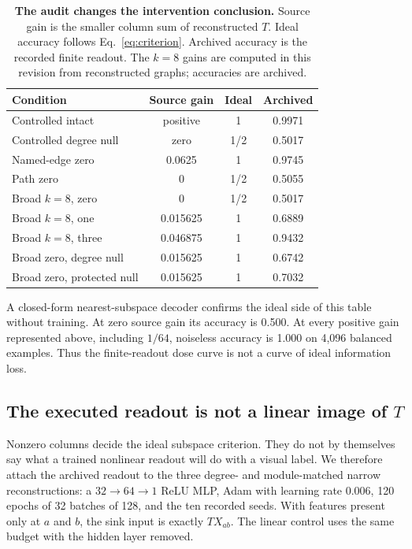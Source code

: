 \begin{table}[t]
\centering
\caption{\textbf{The audit changes the intervention conclusion.} Source gain
is the smaller column sum of reconstructed $T$. Ideal accuracy follows
Eq.~\eqref{eq:criterion}. Archived accuracy is the recorded finite readout.
The $k=8$ gains are computed in this revision from reconstructed graphs;
accuracies are archived.}
\label{tab:audit}
\small
\begin{tabular}{@{}lccc@{}}
\toprule
Condition & Source gain & Ideal & Archived \\
\midrule
Controlled intact & positive & 1 & 0.9971 \\
Controlled degree null & zero & 1/2 & 0.5017 \\
Named-edge zero & 0.0625 & 1 & 0.9745 \\
Path zero & 0 & 1/2 & 0.5055 \\
Broad $k=8$, zero & 0 & 1/2 & 0.5017 \\
Broad $k=8$, one & 0.015625 & 1 & 0.6889 \\
Broad $k=8$, three & 0.046875 & 1 & 0.9432 \\
Broad zero, degree null & 0.015625 & 1 & 0.6742 \\
Broad zero, protected null & 0.015625 & 1 & 0.7032 \\
\bottomrule
\end{tabular}
\end{table}

A closed-form nearest-subspace decoder confirms the ideal side of this table
without training. At zero source gain its accuracy is 0.500. At every positive
gain represented above, including $1/64$, noiseless accuracy is 1.000 on
4,096 balanced examples. Thus the finite-readout dose curve is not a curve of
ideal information loss.

\subsection{The executed readout is not a linear image of $T$}
\label{sec:images}

Nonzero columns decide the ideal subspace criterion. They do not by themselves
say what a trained nonlinear readout will do with a visual label. We therefore
attach the archived readout to the three degree- and module-matched narrow
reconstructions: a $32\!\to\!64\!\to\!1$ ReLU MLP, Adam with learning rate
0.006, 120 epochs of 32 batches of 128, and the ten recorded seeds. With
features present only at $a$ and $b$, the sink input is exactly $TX_{ab}$.
The linear control uses the same budget with the hidden layer removed.

